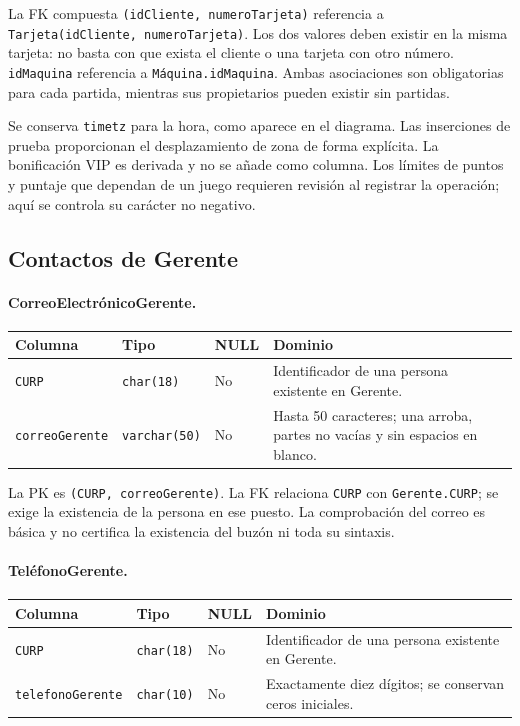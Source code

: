 La FK compuesta \texttt{(idCliente, numeroTarjeta)} referencia a
\texttt{Tarjeta(idCliente, numeroTarjeta)}. Los dos valores deben existir
en la misma tarjeta: no basta con que exista el cliente o una tarjeta
con otro número. \texttt{idMaquina} referencia a
\texttt{Máquina.idMaquina}. Ambas asociaciones son obligatorias para
cada partida, mientras sus propietarios pueden existir sin partidas.

Se conserva \texttt{timetz} para la hora, como aparece en el diagrama.
Las inserciones de prueba proporcionan el desplazamiento de zona de
forma explícita. La bonificación VIP es derivada y no se añade como
columna. Los límites de puntos y puntaje que dependan de un juego
requieren revisión al registrar la operación; aquí se controla su
carácter no negativo.

\clearpage
\subsection{Contactos de Gerente}

\paragraph{CorreoElectrónicoGerente.}
\noindent\begin{tabular}{@{}p{}p{}p{}p{}@{}}
\hline
\textbf{Columna} & \textbf{Tipo} & \textbf{NULL} & \textbf{Dominio} \\
\hline
\texttt{CURP} & \texttt{char(18)} & No & Identificador de una persona existente en Gerente. \\
\texttt{correoGerente} & \texttt{varchar(50)} & No & Hasta 50 caracteres; una arroba, partes no vacías y sin espacios en blanco. \\
\hline
\end{tabular}

La PK es \texttt{(CURP, correoGerente)}. La FK relaciona
\texttt{CURP} con \texttt{Gerente.CURP}; se exige la existencia de
la persona en ese puesto. La comprobación del correo es básica y no
certifica la existencia del buzón ni toda su sintaxis.

\paragraph{TeléfonoGerente.}
\noindent\begin{tabular}{@{}p{}p{}p{}p{}@{}}
\hline
\textbf{Columna} & \textbf{Tipo} & \textbf{NULL} & \textbf{Dominio} \\
\hline
\texttt{CURP} & \texttt{char(18)} & No & Identificador de una persona existente en Gerente. \\
\texttt{telefonoGerente} & \texttt{char(10)} & No & Exactamente diez dígitos; se conservan ceros iniciales. \\
\hline
\end{tabular}

